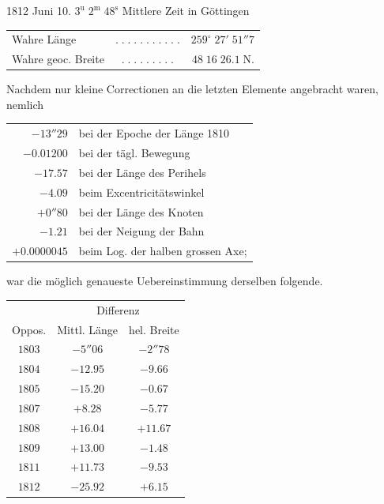 1812 Juni 10. $3^{\mathrm u}\;2^{\mathrm m}\;48^{\mathrm s}$ Mittlere Zeit in Göttingen

\begin{center}\fontsize{10}{12}\selectfont\setlength{\tabcolsep}{2pt}\renewcommand{\arraystretch}{1.15}\begin{tabular}{lcr}
Wahre Länge & $.\;.\;.\;.\;.\;.\;.\;.\;.\;.\;.$ & $259^\circ\;27'\;51''7$\\
Wahre geoc. Breite & $.\;.\;.\;.\;.\;.\;.\;.\;.$ & $48\;16\;26.1\;\mathrm{N}.$\\
\end{tabular}\end{center}

\par\indent Nachdem nur kleine Correctionen an die letzten Elemente angebracht waren,
nemlich

\begin{center}\fontsize{10}{12}\selectfont\setlength{\tabcolsep}{4pt}\renewcommand{\arraystretch}{1.15}\begin{tabular}{rl}
$-13''29$ & bei der Epoche der Länge 1810\\
$-0.01200$ & bei der tägl. Bewegung\\
$-17.57$ & bei der Länge des Perihels\\
$-4.09$ & beim Excentricitätswinkel\\
$+0''80$ & bei der Länge des Knoten\\
$-1.21$ & bei der Neigung der Bahn\\
$+0.0000045$ & beim Log. der halben grossen Axe;\\
\end{tabular}\end{center}

\noindent war die möglich genaueste Uebereinstimmung derselben folgende.

\begin{center}\fontsize{10}{12}\selectfont\setlength{\tabcolsep}{6pt}\renewcommand{\arraystretch}{1.15}\begin{tabular}{c|c|c}
& \multicolumn{2}{c}{Differenz}\\
Oppos. & Mittl. Länge & hel. Breite\\\hline
$1803$ & $-5''06$ & $-2''78$\\
$1804$ & $-12.95$ & $-9.66$\\
$1805$ & $-15.20$ & $-0.67$\\
$1807$ & $+8.28$ & $-5.77$\\
$1808$ & $+16.04$ & $+11.67$\\
$1809$ & $+13.00$ & $-1.48$\\
$1811$ & $+11.73$ & $-9.53$\\
$1812$ & $-25.92$ & $+6.15$\\
\end{tabular}\end{center}


